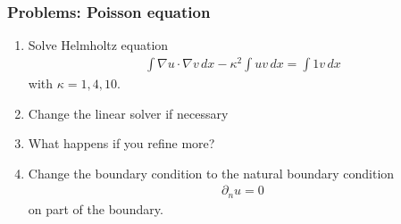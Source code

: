 \begin{frame}
  \frametitle{Problems: Poisson equation}
  \begin{enumerate}
  \item Solve Helmholtz equation
    \begin{gather*}
      \int \nabla u\cdot\nabla v\,dx - \kappa^2 \int uv\,dx= \int 1v\,dx
    \end{gather*}
    with $\kappa = 1, 4, 10$.
  \item Change the linear solver if necessary
  \item What happens if you refine more?
  \item Change the boundary condition to the natural boundary condition
    \begin{gather*}
      \partial_n u = 0
    \end{gather*}
    on part of the boundary.
  \end{enumerate}
\end{frame}
